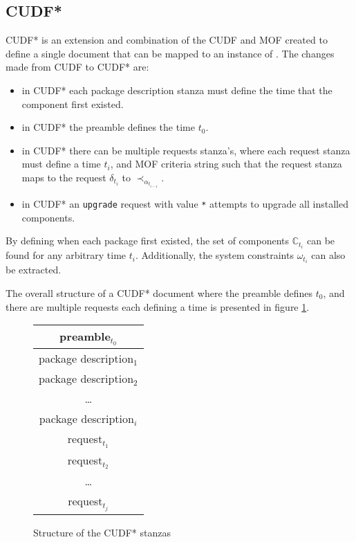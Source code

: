 \subsection{CUDF*}
\label{formal.cudfstar}
CUDF* is an extension and combination of the CUDF and MOF created to define a single document that can be mapped to an instance of \modelname.
The changes made from CUDF to CUDF* are:
\begin{itemize}
  \item in CUDF* each package description stanza must define the time that the component first existed.
  \item in CUDF* the preamble defines the time $t_0$. 
  \item in CUDF* there can be multiple requests stanza's, where each request stanza must define a time $t_i$, and MOF criteria string
  such that the request stanza maps to the request $\delta_{t_i}$ to $\prec_{\alpha_{t_{i-1}}}$.
  \item in CUDF* an \texttt{upgrade} request with value \texttt{*} attempts to upgrade all installed components.
\end{itemize}

By defining when each package first existed, the set of components $\mathbb{C}_{t_i}$ can be found for any arbitrary time $t_i$.
Additionally, the system constraints $\omega_{t_i}$ can also be extracted.

The overall structure of a CUDF* document where the preamble defines $t_0$, and there are multiple requests each defining a time is presented in figure \ref{formal.cudfstarstruct}.
\begin{figure}[htp]
\centering
\begin{tabular}{|c|}
\hline preamble$_{t_0}$ \\ \hline
\hline package description$_{1}$ \\ \hline
\hline package description$_{2}$ \\ \hline
 \multicolumn{1}{c}{\ldots}  \\ 
\hline package description$_{i}$\\ \hline
\hline request$_{t_1}$\\ \hline
\hline request$_{t_2}$\\ \hline
\multicolumn{1}{c}{\ldots}  \\
\hline request$_{t_j}$\\ \hline
\end{tabular}
\caption{Structure of the CUDF* stanzas}
\label{formal.cudfstarstruct}
\end{figure}

